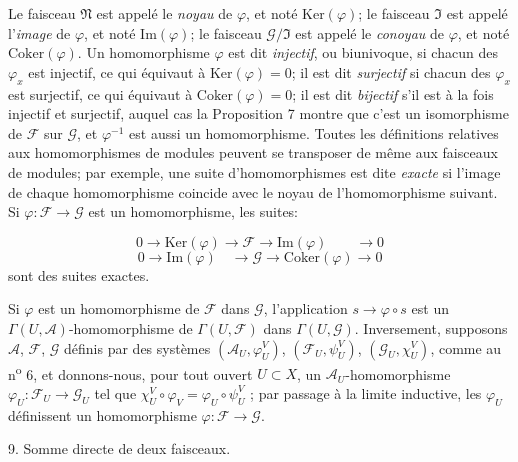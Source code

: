 Le faisceau $\mathfrak{N}$ est appelé le \emph{noyau} de $\varphi$, et noté $\mathrm{Ker}(\varphi)$; le faisceau $\mathfrak{I}$ est appelé l'\emph{image} de $\varphi$, et noté $\mathrm{Im}(\varphi)$; le faisceau $\mathcal{G}/\mathfrak{I}$ est appelé le \emph{conoyau} de $\varphi$, et noté $\mathrm{Coker}(\varphi)$. Un homomorphisme $\varphi$ est dit \emph{injectif}, ou biunivoque, si chacun des $\varphi_x$ est injectif, ce qui équivaut à $\mathrm{Ker}(\varphi) = 0$; il est dit \emph{surjectif} si chacun des $\varphi_x$ est surjectif, ce qui équivaut à $\mathrm{Coker}(\varphi) = 0$; il est dit \emph{bijectif} s'il est à la fois injectif et surjectif, auquel cas la Proposition 7 montre que c'est un isomorphisme de $\mathcal{F}$ sur $\mathcal{G}$, et $\varphi^{-1}$ est aussi un homomorphisme. Toutes les définitions relatives aux homomorphismes de modules peuvent se transposer de même aux faisceaux de modules; par exemple, une suite d'homomorphismes est dite \emph{exacte} si l'image de chaque homomorphisme coincide avec le noyau de l'homomorphisme suivant. Si $\varphi : \mathcal{F} \to \mathcal{G}$ est un homomorphisme, les suites:

\begin{equation*}
0 \to \mathrm{Ker}(\varphi) \to \mathcal{F} \to \mathrm{Im}(\varphi) \qquad \to 0
\end{equation*}
\begin{equation*}
0 \to \mathrm{Im}(\varphi) \quad \to \mathcal{G} \to \mathrm{Coker}(\varphi) \to 0
\end{equation*}
sont des suites exactes.



Si $\varphi$ est un homomorphisme de $\mathcal{F}$ dans $\mathcal{G}$, l'application $s \to \varphi \circ s$ est un $\Gamma(U, \mathcal{A})$-homomorphisme de $\Gamma(U, \mathcal{F})$ dans $\Gamma(U, \mathcal{G})$. Inversement, supposons $\mathcal{A}$, $\mathcal{F}$, $\mathcal{G}$ définis par des systèmes $(\mathcal{A}_U , \varphi_U^V)$, $(\mathcal{F}_U , \psi_U^V)$, $(\mathcal{G}_U , \chi_U^V)$, comme au n\textsuperscript{o} 6, et donnons-nous, pour tout ouvert $U \subset X$, un $\mathcal{A}_U$-homomorphisme $\varphi_U : \mathcal{F}_U \to \mathcal{G}_U$ tel que $\chi_U^V \circ \varphi_V = \varphi_U \circ \psi_U^V$ ; par passage à la limite inductive, les $\varphi_U$ définissent un homomorphisme $\varphi : \mathcal{F} \to \mathcal{G}$.


9. Somme directe de deux faisceaux.

